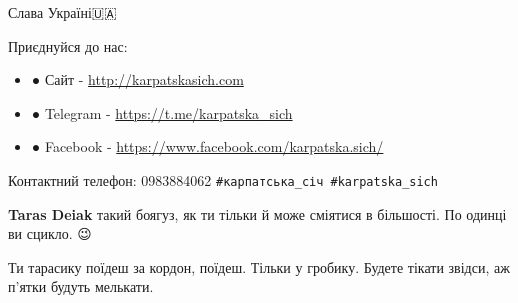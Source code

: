 \begin{itemize}
Слава Україні🇺🇦

Приєднуйся до нас:
\begin{itemize}
  \item ● Сайт - \url{http://karpatskasich.com}
  \item ● Telegram - \url{https://t.me/karpatska_sich}
  \item ● Facebook - \url{https://www.facebook.com/karpatska.sich/}
\end{itemize}
Контактний телефон: 0983884062
\verb|#карпатська_січ #karpatska_sich|

\textbf{Taras Deiak} такий боягуз, як ти тільки й може сміятися в більшості. По одинці ви сцикло. 😉

Ти тарасику поїдеш за кордон, поїдеш. Тільки у гробику. Будете тікати звідси, аж п'ятки будуть мелькати.

\end{itemize}
